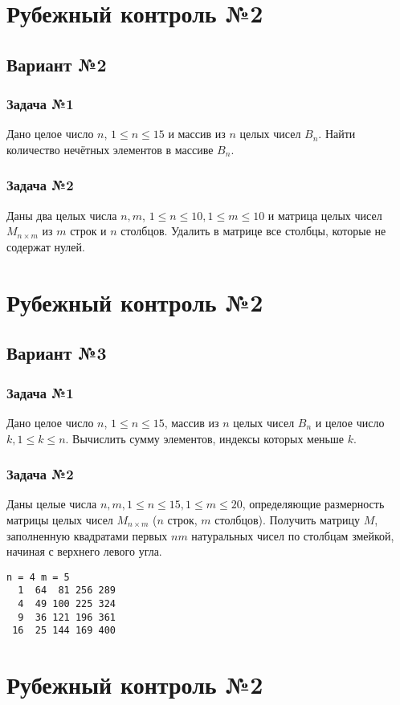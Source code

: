 \documentclass[12pt,a5paper,landscape]{article}
\begin{document}
\clearpage
\section*{Рубежный контроль №2}
\subsection*{Вариант №2}
\subsubsection*{Задача №1}
Дано целое число $n$, $1 \le n \le 15$ и массив из $n$ целых чисел $B_{n}$. Найти количество нечётных элементов в массиве $B_{n}$.
\subsubsection*{Задача №2}
Даны два целых числа $n, m$, $1 \le n \le 10, 1 \le m \le 10$ и матрица целых чисел $M_{n \times m}$ из $m$ строк и $n$ столбцов. Удалить в матрице все столбцы, которые не содержат нулей.


\clearpage
\section*{Рубежный контроль №2}
\subsection*{Вариант №3}
\subsubsection*{Задача №1}
Дано целое число $n$, $1 \le n \le 15$, массив из $n$ целых чисел $B_{n}$ и целое число $k, 1 \le k \le n$. Вычислить сумму элементов, индексы которых меньше $k$.
\subsubsection*{Задача №2}
Даны целые числа $n, m, 1 \le n \le 15, 1 \le m \le 20$, определяющие размерность матрицы целых чисел $M_{n \times m}$ ($n$ строк, $m$ столбцов). Получить матрицу $M$, заполненную квадратами первых $nm$ натуральных чисел по столбцам змейкой, начиная с верхнего левого угла.
\begin{lstlisting}[caption={}]
n = 4 m = 5
  1  64  81 256 289
  4  49 100 225 324
  9  36 121 196 361
 16  25 144 169 400
\end{lstlisting}


\clearpage
\section*{Рубежный контроль №2}
\end{document}
